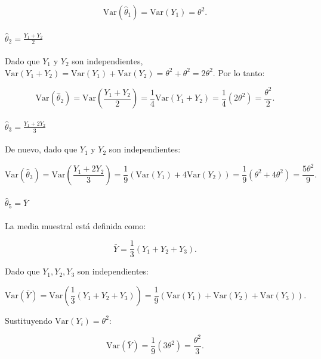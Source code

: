 \documentclass[
]{article}
\begin{document}
\[
\text{Var}(\hat{\theta}_1) = \text{Var}(Y_1) = \theta^2.
\]

\paragraph{\texorpdfstring{\(\hat{\theta}_2 = \frac{Y_1 + Y_2}{2}\)}{\textbackslash hat\{\textbackslash theta\}\_2 = \textbackslash frac\{Y\_1 + Y\_2\}\{2\}}}\label{hattheta_2-fracy_1-y_22-1}

Dado que \(Y_1\) y \(Y_2\) son independientes, \(\text{Var}(Y_1 + Y_2) = \text{Var}(Y_1) + \text{Var}(Y_2) = \theta^2 + \theta^2 = 2\theta^2\). Por lo tanto:

\[
\text{Var}(\hat{\theta}_2) = \text{Var}\left(\frac{Y_1 + Y_2}{2}\right) = \frac{1}{4}\text{Var}(Y_1 + Y_2) = \frac{1}{4}(2\theta^2) = \frac{\theta^2}{2}.
\]

\paragraph{\texorpdfstring{\(\hat{\theta}_3 = \frac{Y_1 + 2Y_2}{3}\)}{\textbackslash hat\{\textbackslash theta\}\_3 = \textbackslash frac\{Y\_1 + 2Y\_2\}\{3\}}}\label{hattheta_3-fracy_1-2y_23-1}

De nuevo, dado que \(Y_1\) y \(Y_2\) son independientes:

\[
\text{Var}(\hat{\theta}_3) = \text{Var}\left(\frac{Y_1 + 2Y_2}{3}\right) = \frac{1}{9}(\text{Var}(Y_1) + 4\text{Var}(Y_2)) = \frac{1}{9}(\theta^2 + 4\theta^2) = \frac{5\theta^2}{9}.
\]

\paragraph{\texorpdfstring{\(\hat{\theta}_5 = \bar{Y}\)}{\textbackslash hat\{\textbackslash theta\}\_5 = \textbackslash bar\{Y\}}}\label{hattheta_5-bary-1}

La media muestral está definida como:

\[
\bar{Y} = \frac{1}{3}(Y_1 + Y_2 + Y_3).
\]

Dado que \(Y_1, Y_2, Y_3\) son independientes:

\[
\text{Var}(\bar{Y}) = \text{Var}\left(\frac{1}{3}(Y_1 + Y_2 + Y_3)\right) = \frac{1}{9}(\text{Var}(Y_1) + \text{Var}(Y_2) + \text{Var}(Y_3)).
\]

Sustituyendo \(\text{Var}(Y_i) = \theta^2\):

\[
\text{Var}(\bar{Y}) = \frac{1}{9}(3\theta^2) = \frac{\theta^2}{3}.
\]
\end{document}
